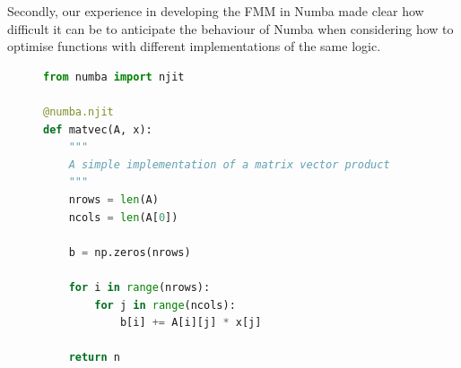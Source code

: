Secondly, our experience in developing the FMM in Numba made clear how difficult it can be to anticipate the behaviour of Numba when considering how to optimise functions with different implementations of the same logic.

\begin{figure}[h]
    \centering
    \begin{lstlisting}[language=Python, caption={An example of a function marked for JIT compilation using the `njit' decorator. At runtime the types of the inputs and outputs are inferred by Numba, and a corresponding machine code is generated and cached. A function call with different input types will lead to another compilation. This is known as multiple dispatch.},  label=code:chpt:1:sec:1:matvec]
from numba import njit

@numba.njit
def matvec(A, x):
    """
    A simple implementation of a matrix vector product
    """
    nrows = len(A)
    ncols = len(A[0])

    b = np.zeros(nrows)

    for i in range(nrows):
        for j in range(ncols):
            b[i] += A[i][j] * x[j]

    return n

\end{lstlisting}
\end{figure}









